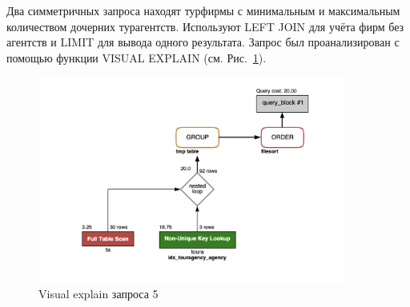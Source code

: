 \documentclass[11pt,a4paper,final]{article}
\begin{document}
Два симметричных запроса находят турфирмы с минимальным и максимальным количеством дочерних турагентств. Используют LEFT JOIN для учёта фирм без агентств и LIMIT для вывода одного результата. Запрос был проанализирован с помощью функции VISUAL EXPLAIN (см. Рис.~\ref{fig:expl5}).
\begin{figure}[H]
    \centering
    \includegraphics[width=0.9\textwidth]{352.png} 
    \caption{Visual explain запроса 5}
    \label{fig:expl5}
\end{figure}
\end{document}
